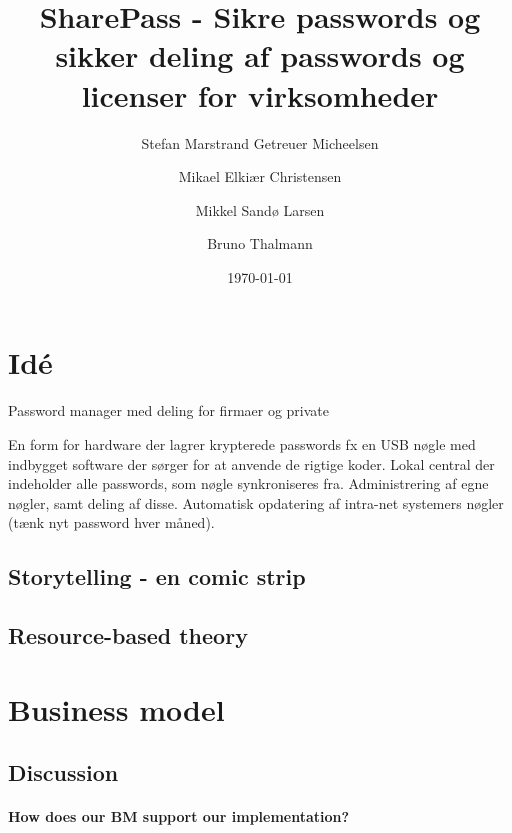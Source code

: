 \documentclass[a4paper]{article}
\title{SharePass - Sikre passwords og sikker deling af passwords og licenser for virksomheder}
\author{Stefan Marstrand Getreuer Micheelsen \and Mikael Elkiær Christensen \and Mikkel Sandø Larsen \and Bruno Thalmann}
\date{\today}
\begin{document}
\maketitle
{}

\section{Idé}
Password manager med deling for firmaer og private

En form for hardware der lagrer krypterede passwords fx en USB nøgle med indbygget software der sørger for at anvende de rigtige koder.
Lokal central der indeholder alle passwords, som nøgle synkroniseres fra.
Administrering af egne nøgler, samt deling af disse.
Automatisk opdatering af intra-net systemers nøgler (tænk nyt password hver måned).

\subsection{Storytelling - en comic strip}



\subsection{Resource-based theory}




\section{Business model}

\subsection{Discussion}

\paragraph{How does our BM support our implementation?}
\end{document}
